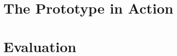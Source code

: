 












%     

%     

\section{The Prototype in Action} %


\section{Evaluation}
\label{sec:evaluation:evaluation}




